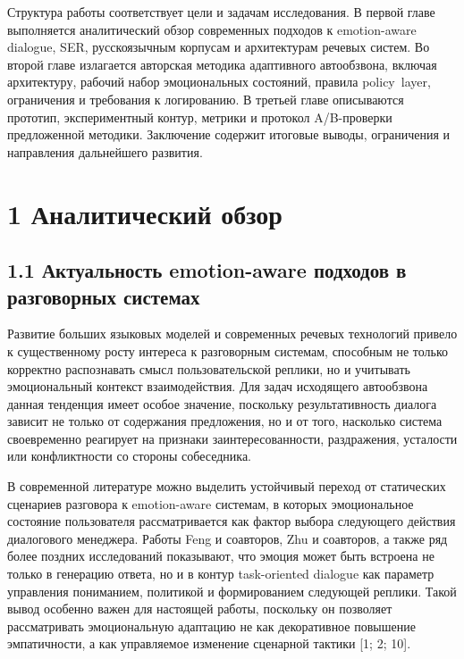 \documentclass[a4paper,14pt]{extarticle}
\renewcommand{\texttt}[1]{\textnormal{#1}}
\begin{document}
Структура работы соответствует цели и задачам исследования. В первой
главе выполняется аналитический обзор современных подходов к
emotion-aware dialogue, SER, русскоязычным корпусам и архитектурам
речевых систем. Во второй главе излагается авторская методика
адаптивного автообзвона, включая архитектуру, рабочий набор
эмоциональных состояний, правила \texttt{policy\ layer}, ограничения и
требования к логированию. В третьей главе описываются прототип,
экспериментный контур, метрики и протокол A/B-проверки предложенной
методики. Заключение содержит итоговые выводы, ограничения и направления
дальнейшего развития.

\section{1 Аналитический
обзор}\label{ux430ux43dux430ux43bux438ux442ux438ux447ux435ux441ux43aux438ux439-ux43eux431ux437ux43eux440}

\subsection{1.1 Актуальность emotion-aware подходов в разговорных
системах}\label{ux430ux43aux442ux443ux430ux43bux44cux43dux43eux441ux442ux44c-emotion-aware-ux43fux43eux434ux445ux43eux434ux43eux432-ux432-ux440ux430ux437ux433ux43eux432ux43eux440ux43dux44bux445-ux441ux438ux441ux442ux435ux43cux430ux445}

Развитие больших языковых моделей и современных речевых технологий
привело к существенному росту интереса к разговорным системам, способным
не только корректно распознавать смысл пользовательской реплики, но и
учитывать эмоциональный контекст взаимодействия. Для задач исходящего
автообзвона данная тенденция имеет особое значение, поскольку
результативность диалога зависит не только от содержания предложения, но
и от того, насколько система своевременно реагирует на признаки
заинтересованности, раздражения, усталости или конфликтности со стороны
собеседника.

В современной литературе можно выделить устойчивый переход от
статических сценариев разговора к emotion-aware системам, в которых
эмоциональное состояние пользователя рассматривается как фактор выбора
следующего действия диалогового менеджера. Работы Feng и соавторов, Zhu
и соавторов, а также ряд более поздних исследований показывают, что
эмоция может быть встроена не только в генерацию ответа, но и в контур
task-oriented dialogue как параметр управления пониманием, политикой и
формированием следующей реплики. Такой вывод особенно важен для
настоящей работы, поскольку он позволяет рассматривать эмоциональную
адаптацию не как декоративное повышение эмпатичности, а как управляемое
изменение сценарной тактики {[}1; 2; 10{]}.
\end{document}
